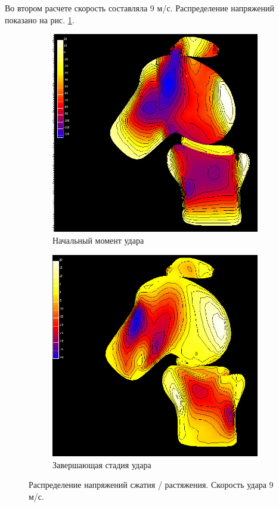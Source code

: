 Во втором расчете скорость составляла 9 м/с. Распределение напряжений показано на рис. \ref{pic:knee_res_2}.

\clearpage
\newpage

\begin{figure}[h]
\centering
\begin{subfigure}[b]{0.6\textwidth}
\centering
\includegraphics[width=\textwidth]{png/cranium/knee-res-2.png}
\caption{Начальный момент удара}
\end{subfigure}
\begin{subfigure}[b]{0.6\textwidth}
\centering
\includegraphics[width=\textwidth]{png/cranium/knee-res-3.png}
\caption{Завершающая стадия удара}
\end{subfigure}
\caption{Распределение напряжений сжатия / растяжения. Скорость удара 9 м/с.}
\label{pic:knee_res_2}
\end{figure}

